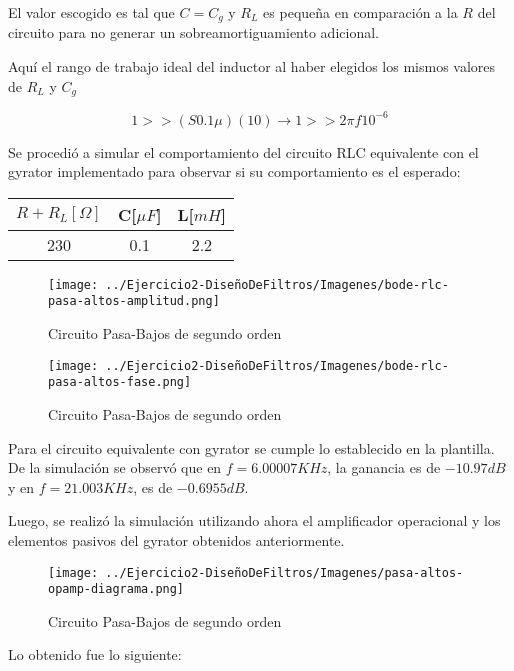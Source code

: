 El valor escogido es tal que $C=C_g$ y $R_L$ es pequeña en comparación a la $R$ del circuito para no generar
un sobreamortiguamiento adicional.

Aquí el rango de trabajo ideal del inductor al haber elegidos los mismos valores de $R_L$ y $C_g$

$$1 >> (S0.1 \mu )(10) \longrightarrow 1  >> 2 \pi f 10^{-6}$$

Se procedió a simular el comportamiento del circuito RLC equivalente con el gyrator implementado para observar si su comportamiento es el esperado:

\begin{table}[H]
    \centering
    \begin{tabular}{|c|c|c|}
    \hline
    \rowcolor[HTML]{C0C0C0} 
    $R+R_L[\Omega]$ & C[$\mu F$] & L[$mH$]  \\ \hline
    230      & 0.1  & 2.2 \\ \hline
    \end{tabular}
    \end{table}

\begin{figure}[H]
    \centering
    \texttt{[image: ../Ejercicio2-DiseñoDeFiltros/Imagenes/bode-rlc-pasa-altos-amplitud.png]}
    \caption{Circuito Pasa-Bajos de segundo orden}
\end{figure}

\begin{figure}[H]
    \centering
    \texttt{[image: ../Ejercicio2-DiseñoDeFiltros/Imagenes/bode-rlc-pasa-altos-fase.png]}
    \caption{Circuito Pasa-Bajos de segundo orden}
\end{figure}

Para el circuito equivalente con gyrator se cumple lo establecido en la plantilla.
De la simulación se observó que en $f=6.00007 KHz$, la ganancia es de $-10.97 dB$ y en $f=21.003KHz$, es de $-0.6955 dB$.

Luego, se realizó la simulación utilizando ahora el amplificador operacional y los elementos pasivos del gyrator obtenidos anteriormente.

\begin{figure}[H]
    \centering
    \texttt{[image: ../Ejercicio2-DiseñoDeFiltros/Imagenes/pasa-altos-opamp-diagrama.png]}
    \caption{Circuito Pasa-Bajos de segundo orden}
\end{figure}

Lo obtenido fue lo siguiente:

